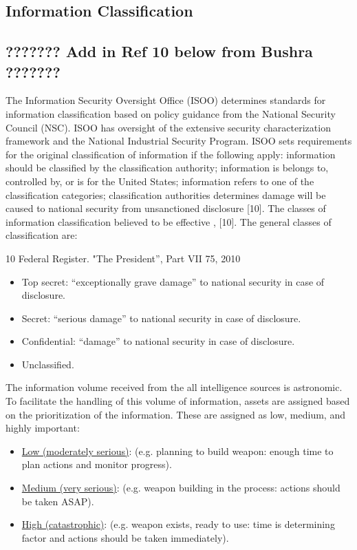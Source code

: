 \documentclass{report}
\begin{document}
\subsection{Information Classification}

\subsection{??????? Add in Ref 10 below from Bushra  ???????}

The Information Security Oversight Office (ISOO) determines standards for information classification based on policy guidance from the National Security Council (NSC). ISOO has oversight of the extensive security characterization framework and the National Industrial Security Program. ISOO sets requirements for the original classification of information if the following apply: information should be classified by the classification authority; information is belongs to, controlled by, or is for the United States; information refers to one of the classification categories; classification authorities determines damage will be caused to national security from unsanctioned disclosure [10]. The classes of information classification believed to be effective \cite{Richelson2011}, [10].  The general classes of classification are:

10 Federal Register. "The President”, Part VII 75, 2010

\begin{itemize}
  \item Top secret: \enquote{exceptionally grave damage} to national security in case of disclosure.
  \item Secret: \enquote{serious damage} to national security in case of disclosure.
  \item Confidential: \enquote{damage} to national security in case of disclosure.
  \item Unclassified.
\end{itemize}

The information volume received from the all intelligence sources is astronomic. To facilitate the handling of this volume of information, assets are assigned based on the prioritization of the information. These are assigned as low, medium, and highly important:

\begin{itemize}
  \item \underline{Low (moderately serious)}: (e.g. planning to build weapon: enough time to plan actions and monitor progress).
  \item \underline{Medium (very serious)}: (e.g. weapon building in the process: actions should be taken ASAP).
  \item \underline{High (catastrophic)}: (e.g. weapon exists, ready to use: time is determining factor and actions should be taken immediately).
\end{itemize}
\end{document}
